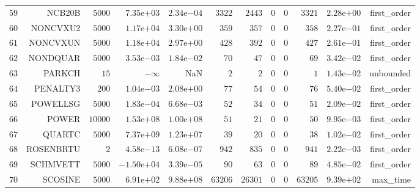 \begin{longtable}{rrrrrrrrrrrr}
  \(    59\) & NCB20B & \(  5000\) & \( 7.35\)e\(+03\) & \( 2.34\)e\(-04\) & \(  3322\) & \(  2443\) & \(     0\) & \(     0\) & \(  3321\) & \( 2.28\)e\(+00\) & first\_order \\
  \(    60\) & NONCVXU2 & \(  5000\) & \( 1.17\)e\(+04\) & \( 3.30\)e\(+00\) & \(   359\) & \(   357\) & \(     0\) & \(     0\) & \(   358\) & \( 2.27\)e\(-01\) & first\_order \\
  \(    61\) & NONCVXUN & \(  5000\) & \( 1.18\)e\(+04\) & \( 2.97\)e\(+00\) & \(   428\) & \(   392\) & \(     0\) & \(     0\) & \(   427\) & \( 2.61\)e\(-01\) & first\_order \\
  \(    62\) & NONDQUAR & \(  5000\) & \( 3.53\)e\(-03\) & \( 1.84\)e\(-02\) & \(    70\) & \(    47\) & \(     0\) & \(     0\) & \(    69\) & \( 3.42\)e\(-02\) & first\_order \\
  \(    63\) & PARKCH & \(    15\) & \(-\infty\) &       NaN & \(     2\) & \(     2\) & \(     0\) & \(     0\) & \(     1\) & \( 1.43\)e\(-02\) & unbounded \\
  \(    64\) & PENALTY3 & \(   200\) & \( 1.04\)e\(-03\) & \( 2.08\)e\(+00\) & \(    77\) & \(    54\) & \(     0\) & \(     0\) & \(    76\) & \( 5.40\)e\(-02\) & first\_order \\
  \(    65\) & POWELLSG & \(  5000\) & \( 1.83\)e\(-04\) & \( 6.68\)e\(-03\) & \(    52\) & \(    34\) & \(     0\) & \(     0\) & \(    51\) & \( 2.09\)e\(-02\) & first\_order \\
  \(    66\) & POWER & \( 10000\) & \( 1.53\)e\(+08\) & \( 1.00\)e\(+08\) & \(    51\) & \(    21\) & \(     0\) & \(     0\) & \(    50\) & \( 9.95\)e\(-03\) & first\_order \\
  \(    67\) & QUARTC & \(  5000\) & \( 7.37\)e\(+09\) & \( 1.23\)e\(+07\) & \(    39\) & \(    20\) & \(     0\) & \(     0\) & \(    38\) & \( 1.02\)e\(-02\) & first\_order \\
  \(    68\) & ROSENBRTU & \(     2\) & \( 4.58\)e\(-13\) & \( 6.08\)e\(-07\) & \(   942\) & \(   835\) & \(     0\) & \(     0\) & \(   941\) & \( 2.22\)e\(-03\) & first\_order \\
  \(    69\) & SCHMVETT & \(  5000\) & \(-1.50\)e\(+04\) & \( 3.39\)e\(-05\) & \(    90\) & \(    63\) & \(     0\) & \(     0\) & \(    89\) & \( 4.85\)e\(-02\) & first\_order \\
  \(    70\) & SCOSINE & \(  5000\) & \( 6.91\)e\(+02\) & \( 9.88\)e\(+08\) & \( 63206\) & \( 26301\) & \(     0\) & \(     0\) & \( 63205\) & \( 9.39\)e\(+02\) & max\_time \\

\end{longtable}
